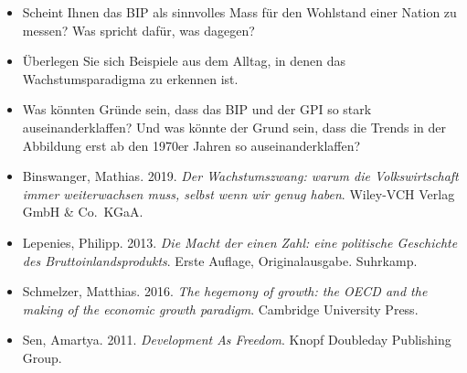 \documentclass[
  nswissgerman,
  a4paper,
  DIV=11,
  numbers=noendperiod,
  oneside,
  openany]{scrreprt}
\providecommand{\tightlist}{%
  \setlength{\itemsep}{0pt}\setlength{\parskip}{0pt}}
\begin{document}
\begin{tcolorbox}[enhanced jigsaw, arc=.35mm, bottomrule=.15mm, bottomtitle=1mm, breakable, colback=white, colbacktitle=quarto-callout-note-color!10!white, colframe=quarto-callout-note-color-frame, coltitle=black, left=2mm, leftrule=.75mm, opacityback=0, opacitybacktitle=0.6, rightrule=.15mm, title={Vertiefungsfragen}, titlerule=0mm, toprule=.15mm, toptitle=1mm]

\begin{itemize}
\tightlist
\item
  Scheint Ihnen das BIP als sinnvolles Mass für den Wohlstand einer
  Nation zu messen? Was spricht dafür, was dagegen?
\item
  Überlegen Sie sich Beispiele aus dem Alltag, in denen das
  Wachstumsparadigma zu erkennen ist.
\item
  Was könnten Gründe sein, dass das BIP und der GPI so stark
  auseinanderklaffen? Und was könnte der Grund sein, dass die Trends in
  der Abbildung erst ab den 1970er Jahren so auseinanderklaffen?
\end{itemize}

\end{tcolorbox}

\begin{tcolorbox}[enhanced jigsaw, arc=.35mm, bottomrule=.15mm, bottomtitle=1mm, breakable, colback=white, colbacktitle=quarto-callout-caution-color!10!white, colframe=quarto-callout-caution-color-frame, coltitle=black, left=2mm, leftrule=.75mm, opacityback=0, opacitybacktitle=0.6, rightrule=.15mm, title={Weiterführende Literatur}, titlerule=0mm, toprule=.15mm, toptitle=1mm]

\begin{itemize}
\tightlist
\item
  Binswanger, Mathias. 2019. \emph{Der Wachstumszwang: warum die
  Volkswirtschaft immer weiterwachsen muss, selbst wenn wir genug
  haben}. Wiley-VCH Verlag GmbH \& Co.~KGaA.
\item
  Lepenies, Philipp. 2013. \emph{Die Macht der einen Zahl: eine
  politische Geschichte des Bruttoinlandsprodukts}. Erste Auflage,
  Originalausgabe. Suhrkamp.
\item
  Schmelzer, Matthias. 2016. \emph{The hegemony of growth: the OECD and
  the making of the economic growth paradigm}. Cambridge University
  Press.
\item
  Sen, Amartya. 2011. \emph{Development As Freedom}. Knopf Doubleday
  Publishing Group.
\end{itemize}

\end{tcolorbox}
\end{document}
